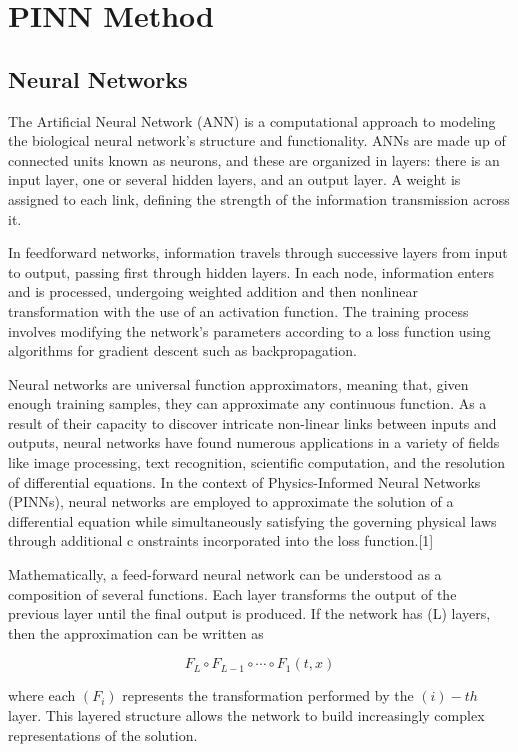 \documentclass[11pt]{article}
\begin{document}
\section{PINN Method}

\subsection{Neural Networks}
The Artificial Neural Network (ANN) is a computational approach to modeling the biological neural 
network's structure and functionality. ANNs are made up of connected units known as neurons,
and these are organized in layers: there is an input layer, one or several hidden layers, and an output layer. 
A weight is assigned to each link, defining the strength of the information transmission across it.

In feedforward networks, information travels through successive layers from input to output,
passing first through hidden layers. In each node, information enters and is processed,
undergoing weighted addition and then nonlinear transformation with the use of an activation function. 
The training process involves modifying the network's parameters according to a loss function using algorithms 
for gradient descent such as backpropagation.

Neural networks are universal function approximators, meaning that, given enough training samples, 
they can approximate any continuous function. 
As a result of their capacity to discover intricate non-linear links between inputs and outputs, 
neural networks have found numerous applications in a variety of fields like image processing, text recognition, 
scientific computation, and the resolution of differential equations.
In the context of Physics-Informed Neural Networks (PINNs), neural networks are employed to 
approximate the solution of a differential 
equation while simultaneously satisfying the governing physical laws through additional c
onstraints incorporated into the loss function.[1]


Mathematically, a feed-forward neural network can be understood as a composition of several functions. Each layer transforms the output of the previous layer until the final output is produced. If the network has (L) layers, then the approximation can be written as

$$F_L \circ F_{L-1} \circ \cdots \circ F_1(t,x)$$


where each $(F_i)$ represents the transformation performed by the $(i)-th$ layer. This layered structure allows the network to build increasingly complex representations of the solution.
\end{document}
